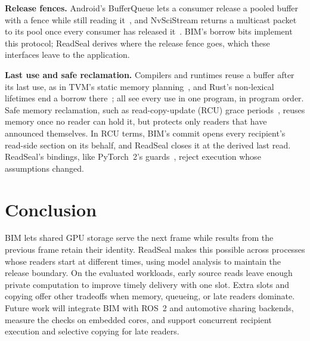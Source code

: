 \documentclass[conference]{IEEEtran}
\newif\ifaidisclosure
\begin{document}
\textbf{Release fences.} Android's BufferQueue lets a consumer release a pooled buffer with a fence while still reading it~\cite{bufferqueue}, and NvSciStream returns a multicast packet to its pool once every consumer has released it~\cite{nvscistream}. BIM's borrow bits implement this protocol; ReadSeal derives where the release fence goes, which these interfaces leave to the application.

\textbf{Last use and safe reclamation.} Compilers and runtimes reuse a buffer after its last use, as in TVM's static memory planning~\cite{tvm}, and Rust's non-lexical lifetimes end a borrow there~\cite{nll}; all see every use in one program, in program order. Safe memory reclamation, such as read-copy-update (RCU) grace periods~\cite{rcu}, reuses memory once no reader can hold it, but protects only readers that have announced themselves. In RCU terms, BIM's commit opens every recipient's read-side section on its behalf, and ReadSeal closes it at the derived last read. ReadSeal's bindings, like PyTorch~2's guards~\cite{pytorch2}, reject execution whose assumptions changed.

\section{Conclusion}

BIM lets shared GPU storage serve the next frame while results from the previous frame retain their identity. ReadSeal makes this possible across processes whose readers start at different times, using model analysis to maintain the release boundary. On the evaluated workloads, early source reads leave enough private computation to improve timely delivery with one slot. Extra slots and copying offer other tradeoffs when memory, queueing, or late readers dominate. Future work will integrate BIM with ROS~2 and automotive sharing backends, measure the checks on embedded cores, and support concurrent recipient execution and selective copying for late readers.

\ifaidisclosure
\section*{Acknowledgment}
OpenAI Codex assisted with language editing, readability revisions, evidence cross-checking, and build verification for this revision. Figures retain the source-based reconstruction from r15. Experimental data and figure values are unchanged.
\fi



\end{document}
